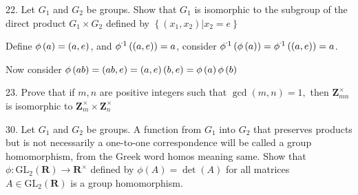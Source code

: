 \newpage
\begin{mdframed}[style=darkQuesion]
22. Let $G_{1}$ and $G_{2}$ be groups. Show that $G_{1}$ is isomorphic to the subgroup of the direct product $G_{1} \times G_{2}$ defined by $\left\{\left(x_{1}, x_{2}\right) | x_{2}=e\right\}$
\end{mdframed}
\begin{mdframed}[style=darkAnswer,frametitle={Joe Starr}]
  Define $\phi\left(a\right)=\left(a,e\right)$, and $\pofinv{\lrp{a,e}}=a$, consider 
  $\pofinv{\pof{a}}=\pofinv{\lrp{a,e}}=a$. 
  
  Now consider $\phi\left(ab\right)=\left(ab,e\right)=\left(a,e\right)\left(b,e\right)=\phi\left(a\right)\phi\left(b\right)$
\end{mdframed}
\newpage
\begin{mdframed}[style=darkQuesion]
23. Prove that if $m, n$ are positive integers such that $\operatorname{gcd}(m, n)=1,$ then $\mathbf{Z}_{m n}^{\times}$ is isomorphic to $\mathbf{Z}_{m}^{\times} \times \mathbf{Z}_{n}^{\times}$
\end{mdframed}
\begin{mdframed}[style=darkAnswer,frametitle={Joe Starr}]
\end{mdframed}
\newpage
\begin{mdframed}[style=darkQuesion]
30. Let $G_{1}$ and $G_{2}$ be groups. A function from $G_{1}$ into $G_{2}$ that preserves products but
is not necessarily a one-to-one correspondence will be called a group homomorphism, from the Greek word homos meaning same. Show that $\phi: \mathrm{GL}_{2}(\mathbf{R}) \rightarrow \mathbf{R}^{\times}$ defined by $\phi(A)=\operatorname{det}(A)$ for all matrices $A \in \mathrm{GL}_{2}(\mathbf{R})$ is a group homomorphism.
\end{mdframed}
\begin{mdframed}[style=darkAnswer,frametitle={Joe Starr}]
\end{mdframed}
\newpage
